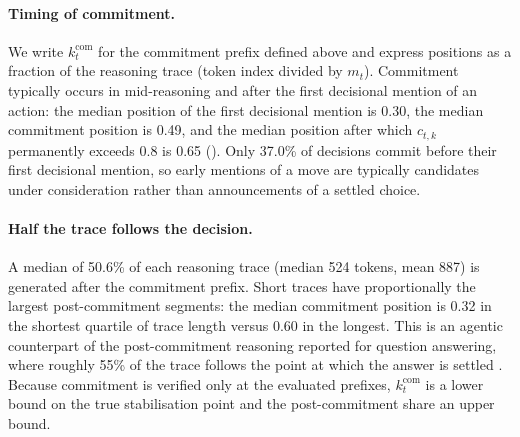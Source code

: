 \documentclass{article}
\begin{document}


\paragraph{Timing of commitment.}
We write $k_t^{\mathrm{com}}$ for the commitment prefix defined above and express positions as a fraction of the reasoning trace (token index divided by $m_t$).
Commitment typically occurs in mid-reasoning and after the first decisional mention of an action: the median position of the first decisional mention is 0.30, the median commitment position is 0.49, and the median position after which $c_{t,k}$ permanently exceeds 0.8 is 0.65 ().
Only 37.0\% of decisions commit before their first decisional mention, so early mentions of a move are typically candidates under consideration rather than announcements of a settled choice.
\paragraph{Half the trace follows the decision.}
A median of 50.6\% of each reasoning trace (median 524 tokens, mean 887) is generated after the commitment prefix.
Short traces have proportionally the largest post-commitment segments: the median commitment position is 0.32 in the shortest quartile of trace length versus 0.60 in the longest.
This is an agentic counterpart of the post-commitment reasoning reported for question answering, where roughly 55\% of the trace follows the point at which the answer is settled \cite{scalena2026beyond}.
Because commitment is verified only at the evaluated prefixes, $k_t^{\mathrm{com}}$ is a lower bound on the true stabilisation point and the post-commitment share an upper bound.
\end{document}
